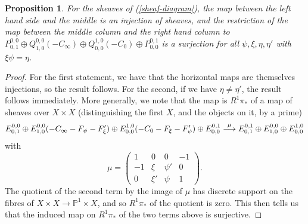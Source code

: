 \documentclass[12pt]{article}
\newtheorem{proposition}[theorem]{Proposition}
\theoremstyle{definition}
\theoremstyle{remark}
\numberwithin{theorem}{section}
\def\bP{{\mathbb {P}}}
\begin{document}
\begin{proposition} For the sheaves  of (\ref{sheaf-diagram}), the map between the  left hand side  and the middle is an   injection of sheaves, and  the restriction of the map between the middle column and the right hand column to  $P^{0,0}_{0,1}\oplus Q_{ 1,0}^{0,0}(-C_\infty )\oplus Q_{0 ,0}^{ 1,0} (-C_0 )\oplus P^{0,1}_{0,0}$ is a  surjection  for all $\psi, \xi,\eta, \eta'$ with $\xi\psi =\eta $.
 \end{proposition} 
\begin{proof} For the first statement, we have that the horizontal maps are themselves injections, so the result follows. For the second, if we have $\eta\neq \eta'$, the result follows immediately. More generally, we note that the map is $R^1\pi_*$ of a map of sheaves over $X\times X$ (distinguishing the first $X$, and the objects on it, by a prime)
$$E_{0,1}^{0,0}    \oplus E_{1,0}^{0,0} (-C_\infty-F_\psi -F'_\xi ) \oplus E_{0,0}^{1,0}(-C_0-F_\xi- F'_\psi)    \oplus E_{0,0}^{0,1} \buildrel {\mu}\over{\longrightarrow}
E_{0,1}^{0,1}  \oplus E^{0,0}_{1,0}  \oplus E^{1,0}_{0,0}$$
with 
$$\mu = \begin{pmatrix}   1&  0&0 &-1\\ -1 &\xi&\psi'& 0\\ 0& \xi'&\psi &1\end{pmatrix}.$$
The quotient of the second term by the image of $\mu$ has discrete support on the fibres of $X\times X\rightarrow \bP^1\times X$, and so $R^1\pi_*$ of the quotient is zero. This then tells us that the induced map  on $R^1\pi_*$ of the two terms above is surjective.
\end{proof}
\end{document}
